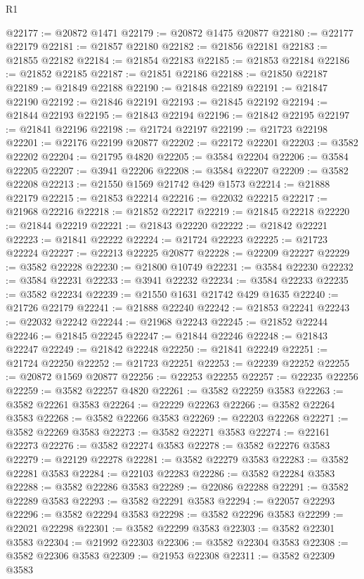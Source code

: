 \begin{lexlean}{R1}
\begin{coremodule}
@22177 := @20872 @1471
@22179 := @20872 @1475 @20877
@22180 := @22177 @22179
@22181 := @21857 @22180
@22182 := @21856 @22181
@22183 := @21855 @22182
@22184 := @21854 @22183
@22185 := @21853 @22184
@22186 := @21852 @22185
@22187 := @21851 @22186
@22188 := @21850 @22187
@22189 := @21849 @22188
@22190 := @21848 @22189
@22191 := @21847 @22190
@22192 := @21846 @22191
@22193 := @21845 @22192
@22194 := @21844 @22193
@22195 := @21843 @22194
@22196 := @21842 @22195
@22197 := @21841 @22196
@22198 := @21724 @22197
@22199 := @21723 @22198
@22201 := @22176 @22199 @20877
@22202 := @22172 @22201
@22203 := @3582 @22202
@22204 := @21795 @4820
@22205 := @3584 @22204
@22206 := @3584 @22205
@22207 := @3941 @22206
@22208 := @3584 @22207
@22209 := @3582 @22208
@22213 := @21550 @1569 @21742 @429 @1573
@22214 := @21888 @22179
@22215 := @21853 @22214
@22216 := @22032 @22215
@22217 := @21968 @22216
@22218 := @21852 @22217
@22219 := @21845 @22218
@22220 := @21844 @22219
@22221 := @21843 @22220
@22222 := @21842 @22221
@22223 := @21841 @22222
@22224 := @21724 @22223
@22225 := @21723 @22224
@22227 := @22213 @22225 @20877
@22228 := @22209 @22227
@22229 := @3582 @22228
@22230 := @21800 @10749
@22231 := @3584 @22230
@22232 := @3584 @22231
@22233 := @3941 @22232
@22234 := @3584 @22233
@22235 := @3582 @22234
@22239 := @21550 @1631 @21742 @429 @1635
@22240 := @21726 @22179
@22241 := @21888 @22240
@22242 := @21853 @22241
@22243 := @22032 @22242
@22244 := @21968 @22243
@22245 := @21852 @22244
@22246 := @21845 @22245
@22247 := @21844 @22246
@22248 := @21843 @22247
@22249 := @21842 @22248
@22250 := @21841 @22249
@22251 := @21724 @22250
@22252 := @21723 @22251
@22253 := @22239 @22252
@22255 := @20872 @1569 @20877
@22256 := @22253 @22255
@22257 := @22235 @22256
@22259 := @3582 @22257 @4820
@22261 := @3582 @22259 @3583
@22263 := @3582 @22261 @3583
@22264 := @22229 @22263
@22266 := @3582 @22264 @3583
@22268 := @3582 @22266 @3583
@22269 := @22203 @22268
@22271 := @3582 @22269 @3583
@22273 := @3582 @22271 @3583
@22274 := @22161 @22273
@22276 := @3582 @22274 @3583
@22278 := @3582 @22276 @3583
@22279 := @22129 @22278
@22281 := @3582 @22279 @3583
@22283 := @3582 @22281 @3583
@22284 := @22103 @22283
@22286 := @3582 @22284 @3583
@22288 := @3582 @22286 @3583
@22289 := @22086 @22288
@22291 := @3582 @22289 @3583
@22293 := @3582 @22291 @3583
@22294 := @22057 @22293
@22296 := @3582 @22294 @3583
@22298 := @3582 @22296 @3583
@22299 := @22021 @22298
@22301 := @3582 @22299 @3583
@22303 := @3582 @22301 @3583
@22304 := @21992 @22303
@22306 := @3582 @22304 @3583
@22308 := @3582 @22306 @3583
@22309 := @21953 @22308
@22311 := @3582 @22309 @3583

\end{coremodule}
\end{lexlean}
